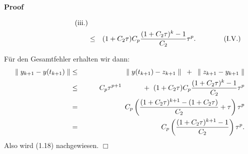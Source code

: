 \documentclass{book}
\newenvironment{enumerateroman}{\begin{enumerate}[i.] }{\end{enumerate}}
\newenvironment{itemizedot}{\begin{itemize} \renewcommand{\labelitemi}{$\bullet$}\renewcommand{\labelitemii}{$\bullet$}\renewcommand{\labelitemiii}{$\bullet$}\renewcommand{\labelitemiv}{$\bullet$}}{\end{itemize}}
\newenvironment{proof}{\noindent\textbf{Proof\ }}{\hspace*{\fill}$\Box$\medskip}
\begin{document}
\begin{proof}
\begin{itemizedot}
\begin{enumerateroman}
\begin{eqnarray*}
        \text{{\hspace{8em}}(iii.)}\\
        & \leq & (1 + C_2 \tau) C_p \frac{(1 + C_2 \tau)^k - 1}{C_2} \tau^p .
        \text{{\hspace{4em}}(I.V.)}
      \end{eqnarray*}
    \end{enumerateroman}
  \end{itemizedot}
  {\hspace{1.7em}}F{\"u}r den Gesamtfehler erhalten wir dann:
  \begin{eqnarray*}
    \parallel y_{k + 1} - y (t_{k + 1}) \parallel & \leq & \parallel y (t_{k +
    1}) - z_{k + 1} \parallel \enspace + \text{\enspace} \parallel z_{k + 1} -
    y_{k + 1} \parallel\\
    & \leq & \text{{\hspace{2.1em}}} C_p \tau^{p + 1} \hspace{3em} + \text{ }
    (1 + C_2 \tau) C_p \frac{(1 + C_2 \tau)^k - 1}{C_2} \tau^p\\
    & = & C_p \left( \frac{(1 + C_2 \tau)^{k + 1} - (1 + C_2 \tau)}{C_2} +
    \tau \right) \tau^p\\
    & = & C_p \left( \frac{(1 + C_2 \tau)^{k + 1} - 1}{C_2} \right) \tau^p .
  \end{eqnarray*}
  {\hspace{1.8em}}Also wird (1.18) nachgewiesen.
\end{proof}
\end{document}
